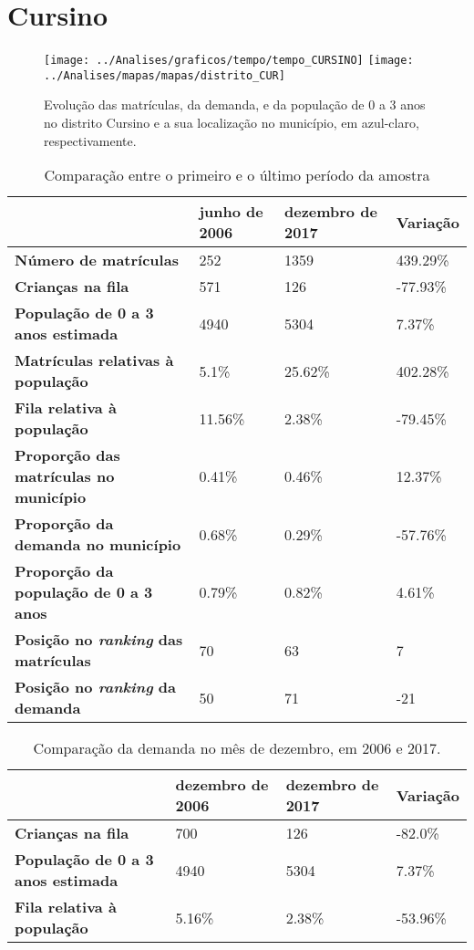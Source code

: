 \section{Cursino}
\begin{figure}[H]
\centering
\texttt{[image: ../Analises/graficos/tempo/tempo\_CURSINO]}
\texttt{[image: ../Analises/mapas/mapas/distrito\_CUR]}
\caption{Evolução das matrículas, da demanda, e da população de 0 a 3 anos no distrito Cursino e a sua localização no município, em azul-claro, respectivamente.}
\end{figure}
\begin{table}[H]
\begin{tabular}{l|l|l|l}
\textbf{}                                      & \textbf{junho de 2006}       & \textbf{dezembro de 2017}    & \textbf{Variação} \\ \hline
\textbf{Número de matrículas}                  & 252 & 1359 & 439.29\% \\ \hline
\textbf{Crianças na fila}                      & 571 & 126 & -77.93\% \\ \hline
\textbf{População de 0 a 3 anos estimada}      & 4940 & 5304 & 7.37\% \\ \hline
\textbf{Matrículas relativas à população}      & 5.1\% & 25.62\% & 402.28\% \\ \hline
\textbf{Fila relativa à população}             & 11.56\% & 2.38\% & -79.45\% \\ \hline
\textbf{Proporção das matrículas no município} & 0.41\% & 0.46\% & 12.37\% \\ \hline
\textbf{Proporção da demanda no município}     & 0.68\% & 0.29\% & -57.76\% \\ \hline
\textbf{Proporção da população de 0 a 3 anos}  & 0.79\% & 0.82\% & 4.61\% \\ \hline
\textbf{Posição no \textit{ranking} das matrículas}     & 70 & 63 & 7 \\ \hline
\textbf{Posição no \textit{ranking} da demanda}         & 50 & 71 & -21 \\ 
\end{tabular}
\caption{Comparação entre o primeiro e o último período da amostra}
\end{table}
\begin{table}[H]
\begin{tabular}{l|l|l|l}
\textbf{}                                 & \textbf{dezembro de 2006} & \textbf{dezembro de 2017} & \textbf{Variação} \\ \hline
\textbf{Crianças na fila}                      & 700 & 126 & -82.0\% \\ \hline
\textbf{População de 0 a 3 anos estimada}      & 4940 & 5304 & 7.37\% \\ \hline
\textbf{Fila relativa à população}             & 5.16\% & 2.38\% & -53.96\% \\
\end{tabular}
\caption{Comparação da demanda no mês de dezembro, em 2006 e 2017.}
\end{table}
